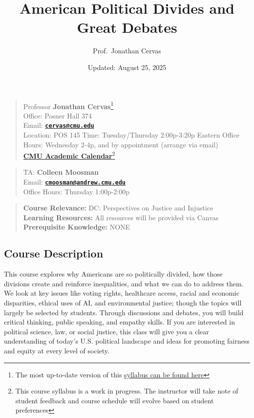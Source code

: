 \documentclass[]{tufte-handout}
\title[American Political Divides and Great Debates]{American Political
Divides and Great Debates}
\author{Prof.~Jonathan Cervas}
\date{Updated: August 25, 2025}
\begin{document}
\maketitle




\begin{quote}
Professor \textbf{Jonathan Cervas}\footnote{The most up-to-date version
  of this
  \href{https://github.com/jcervas/teaching/blob/main/2025-2026/class-cmu-84-309/syllabus.md}{syllabus
  can be found here}}\\
Office: Posner Hall 374\\
Email:
\textbf{\href{mailto:cervas@cmu.edu}{\nolinkurl{cervas@cmu.edu}}}\\
Location: POS 145 Time: Tuesday/Thursday 2:00p-3:20p Eastern Office
Hours: Wednesday 2-4p, and by appointment (arrange via email)\\
\href{https://www.cmu.edu/hub/calendar/}{\textbf{CMU Academic
Calendar}}\footnote{This course syllabus is a work in progress. The
  instructor will take note of student feedback and course schedule will
  evolve based on student preferences}
\end{quote}

\begin{quote}
TA: \textbf{Colleen Moosman}\\
Email:
\textbf{\href{mailto:cmoosman@andrew.cmu.edu}{\nolinkurl{cmoosman@andrew.cmu.edu}}}\\
Office Hours: Thursday 1:00p-2:00p
\end{quote}

\begin{quote}
\textbf{Course Relevance:} DC: Perspectives on Justice and Injustice\\
\textbf{Learning Resources:} All resources will be provided via Canvas\\
\textbf{Prerequisite Knowledge:} NONE
\end{quote}

\hypertarget{course-description}{%
\subsection{Course Description}\label{course-description}}

This course explores why Americans are so politically divided, how those
divisions create and reinforce inequalities, and what we can do to
address them. We look at key issues like voting rights, healthcare
access, racial and economic disparities, ethical uses of AI, and
environmental justice; though the topics will largely be selected by
students. Through discussions and debates, you will build critical
thinking, public speaking, and empathy skills. If you are interested in
political science, law, or social justice, this class will give you a
clear understanding of today's U.S. political landscape and ideas for
promoting fairness and equity at every level of society.
\end{document}
